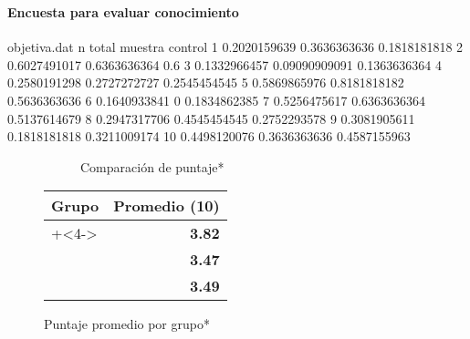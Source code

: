 \begin{frame}[t,fragile]
\frametitle{\pagetitle}
\framesubtitle{Encuesta para evaluar conocimiento}

\begin{filecontents}{objetiva.dat}
n	total        muestra	    control
1	0.2020159639 0.3636363636	0.1818181818
2	0.6027491017 0.6363636364	0.6
3	0.1332966457 0.09090909091	0.1363636364
4	0.2580191298 0.2727272727	0.2545454545
5	0.5869865976 0.8181818182	0.5636363636
6	0.1640933841 0	            0.1834862385
7	0.5256475617 0.6363636364	0.5137614679
8	0.2947317706 0.4545454545	0.2752293578
9	0.3081905611 0.1818181818	0.3211009174
10	0.4498120076 0.3636363636	0.4587155963
\end{filecontents}

\begin{figure}
\begin{subfigure}[b]{.5\linewidth}
    \caption{Comparación de puntaje*}
\end{subfigure}\hfill
\pause
\pause
\pause
\begin{subtable}[b]{.5\linewidth}
    \centering
    \scriptsize
    \begin{tabular}{lr}
    \toprule
    \textbf{Grupo}         & \textbf{Promedio (10)} \\
    \midrule
    \onslide+<4->{Usuarios & \textbf{3.82}  \\}
    \onslide+<5->{Control  & \textbf{3.47} \\\midrule}
    \onslide+<6->{Total    & \textbf{3.49}}
    \\\bottomrule
    \end{tabular}
    \caption{Puntaje promedio por grupo*}
\end{subtable}
\end{figure}
 

\end{frame}
